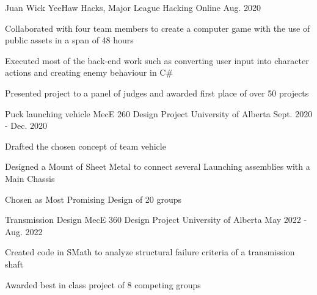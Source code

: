 

\begin{cventries}

  \cventry
    {Juan Wick} %
    {YeeHaw Hacks, Major League Hacking} %
    {Online} %
    {Aug. 2020} %
    {
      \begin{cvitems} %
        \item Collaborated with four team members to create a computer game with the
        use of public assets in a span of 48 hours
        \item Executed most of the back-end work such as converting user input into
        character actions and creating enemy behaviour in C\#
        \item Presented project to a panel of judges and awarded first place of over 50
        projects
      \end{cvitems}
    }

\cventry
{Puck launching vehicle} %
{MecE 260 Design Project} %
{University of Alberta} %
{Sept. 2020 - Dec. 2020} %
{
  \begin{cvitems} %
    \item Drafted the chosen concept of team vehicle
    \item Designed a Mount of Sheet Metal to connect several Launching assemblies with a Main Chassis
    \item Chosen as Most Promising Design of 20 groups
  \end{cvitems}
}

\cventry
{Transmission Design} %
{MecE 360 Design Project} %
{University of Alberta} %
{May 2022 - Aug. 2022} %
{
  \begin{cvitems} %
    \item Created code in SMath to analyze structural failure criteria of a transmission shaft
    \item Awarded best in class project of 8 competing groups
  \end{cvitems}
}


\end{cventries}
